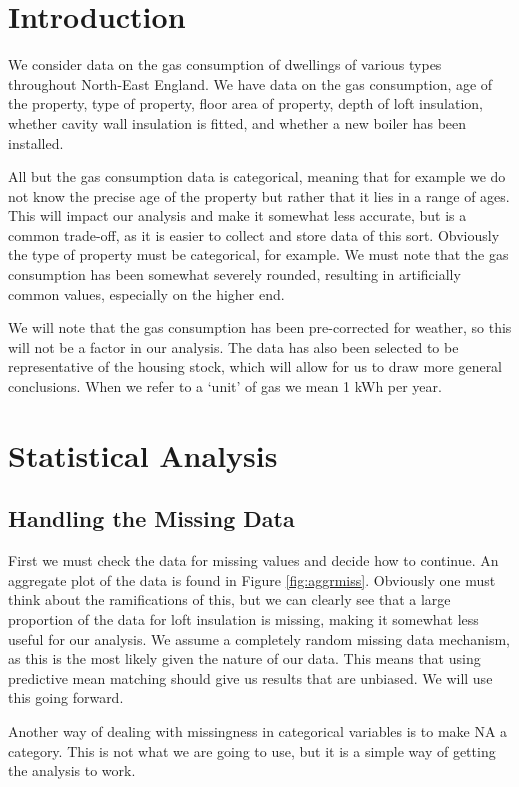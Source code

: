\documentclass[]{extarticle}
\begin{document}
\section{Introduction}

We consider data on the gas consumption of dwellings of various types throughout North-East England. We have data on the gas consumption, age of the property, type of property, floor area of property, depth of loft insulation, whether cavity wall insulation is fitted, and whether a new boiler has been installed.

All but the gas consumption data is categorical, meaning that for example we do not know the precise age of the property but rather that it lies in a range of ages. This will impact our analysis and make it somewhat less accurate, but is a common trade-off, as it is easier to collect and store data of this sort. Obviously the type of property must be categorical, for example. We must note that the gas consumption has been somewhat severely rounded, resulting in artificially common values, especially on the higher end.

We will note that the gas consumption has been pre-corrected for weather, so this will not be a factor in our analysis. The data has also been selected to be representative of the housing stock, which will allow for us to draw more general conclusions. When we refer to a `unit' of gas we mean 1 kWh per year.

\section{Statistical Analysis}

\subsection{Handling the Missing Data}

First we must check the data for missing values and decide how to continue. An aggregate plot of the data is found in Figure \ref{fig:aggrmiss}. Obviously one must think about the ramifications of this, but we can clearly see that a large proportion of the data for loft insulation is missing, making it somewhat less useful for our analysis. We assume a completely random missing data mechanism, as this is the most likely given the nature of our data. This means that using predictive mean matching should give us results that are unbiased. We will use this going forward.

Another way of dealing with missingness in categorical variables is to make NA a category. This is not what we are going to use, but it is a simple way of getting the analysis to work.
\end{document}
